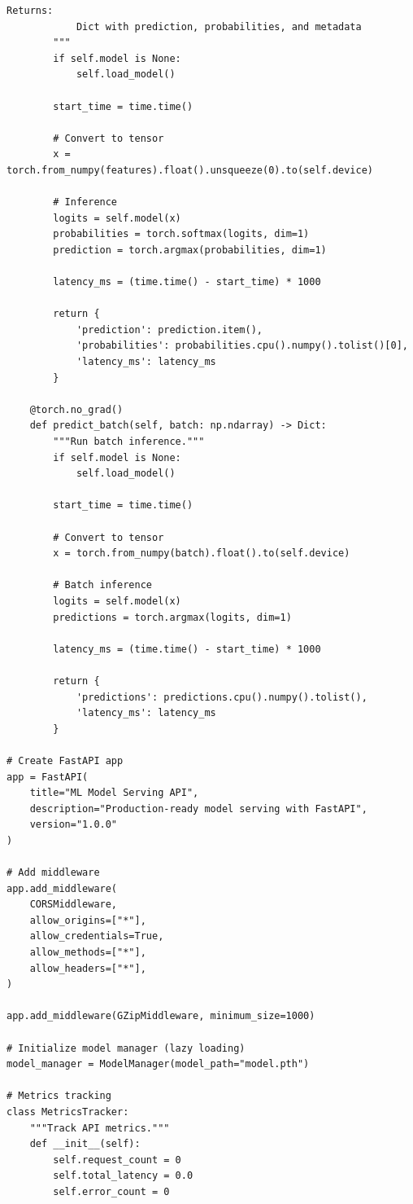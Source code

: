 \begin{lstlisting}[style=python, caption=Production-ready FastAPI model serving]
        Returns:
            Dict with prediction, probabilities, and metadata
        """
        if self.model is None:
            self.load_model()

        start_time = time.time()

        # Convert to tensor
        x = torch.from_numpy(features).float().unsqueeze(0).to(self.device)

        # Inference
        logits = self.model(x)
        probabilities = torch.softmax(logits, dim=1)
        prediction = torch.argmax(probabilities, dim=1)

        latency_ms = (time.time() - start_time) * 1000

        return {
            'prediction': prediction.item(),
            'probabilities': probabilities.cpu().numpy().tolist()[0],
            'latency_ms': latency_ms
        }

    @torch.no_grad()
    def predict_batch(self, batch: np.ndarray) -> Dict:
        """Run batch inference."""
        if self.model is None:
            self.load_model()

        start_time = time.time()

        # Convert to tensor
        x = torch.from_numpy(batch).float().to(self.device)

        # Batch inference
        logits = self.model(x)
        predictions = torch.argmax(logits, dim=1)

        latency_ms = (time.time() - start_time) * 1000

        return {
            'predictions': predictions.cpu().numpy().tolist(),
            'latency_ms': latency_ms
        }

# Create FastAPI app
app = FastAPI(
    title="ML Model Serving API",
    description="Production-ready model serving with FastAPI",
    version="1.0.0"
)

# Add middleware
app.add_middleware(
    CORSMiddleware,
    allow_origins=["*"],
    allow_credentials=True,
    allow_methods=["*"],
    allow_headers=["*"],
)

app.add_middleware(GZipMiddleware, minimum_size=1000)

# Initialize model manager (lazy loading)
model_manager = ModelManager(model_path="model.pth")

# Metrics tracking
class MetricsTracker:
    """Track API metrics."""
    def __init__(self):
        self.request_count = 0
        self.total_latency = 0.0
        self.error_count = 0


\end{lstlisting}
